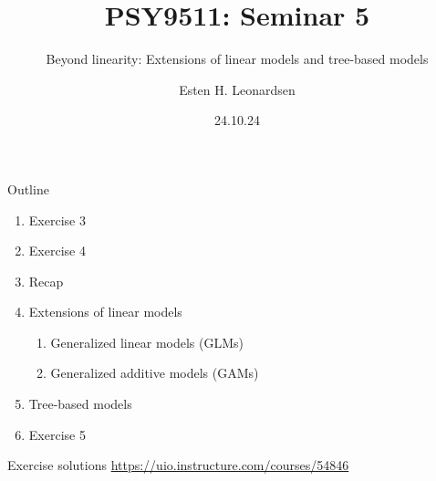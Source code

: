 \documentclass{beamer}
\title{PSY9511: Seminar 5}
\subtitle{Beyond linearity: Extensions of linear models and tree-based models}
\author{Esten H. Leonardsen}
\date{24.10.24}
\begin{document}
	\begin{frame}
	 	\maketitle
	\end{frame}

    \begin{frame}{Outline}
        \begin{enumerate}
            \item Exercise 3
            \item Exercise 4
            \item Recap
            \item Extensions of linear models
            \begin{enumerate}
                \item Generalized linear models (GLMs)
                \item Generalized additive models (GAMs)
            \end{enumerate}
            \item Tree-based models
            \item Exercise 5
        \end{enumerate}
    \end{frame}

    \begin{frame}{Exercise solutions}
        \centering
        \vfill
        \small{\url{https://uio.instructure.com/courses/54846}}
        \vfill
    \end{frame}

    
    
    
    
    
    
\end{document}

